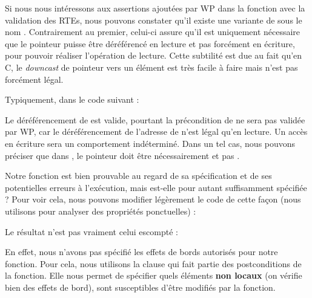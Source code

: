 Si nous nous intéressons aux assertions ajoutées par WP dans la fonction 
avec la validation des RTEs, nous pouvons constater qu'il existe une variante
de  sous le nom . Contrairement au premier,
celui-ci assure qu'il est uniquement nécessaire que le pointeur puisse
être déréférencé en lecture et pas forcément en écriture, pour pouvoir
réaliser l'opération de lecture. Cette subtilité est due au fait qu'en C, le
\textit{downcast} de pointeur vers un élément  est très facile à faire mais
n'est pas forcément légal.



Typiquement, dans le code suivant :






Le déréférencement de  est valide, pourtant la précondition de 
ne sera pas validée par WP, car le déréférencement de l'adresse de 
n'est légal qu'en lecture. Un accès en écriture sera un comportement
indéterminé. Dans un tel cas, nous pouvons préciser que dans , le
pointeur  doit être nécessairement  et pas .





Notre fonction  est bien prouvable au regard de sa spécification et
de ses potentielles erreurs à l'exécution, mais est-elle pour autant
suffisamment spécifiée ? Pour voir cela, nous pouvons modifier légèrement le code
de cette façon (nous utilisons  pour analyser des propriétés
ponctuelles) :






Le résultat n'est pas vraiment celui escompté :





En effet, nous n'avons pas spécifié les effets de bords autorisés pour notre
fonction. Pour cela, nous utilisons la clause 
qui fait partie des postconditions de la fonction. Elle nous permet de spécifier
quels éléments \textbf{non locaux} (on vérifie bien des effets de bord), sont
susceptibles d'être modifiés par la fonction.



